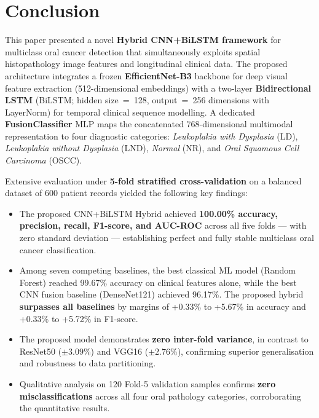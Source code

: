 %

\section{Conclusion}
\label{sec:conclusion}

This paper presented a novel \textbf{Hybrid CNN+BiLSTM framework} for multiclass oral cancer detection that simultaneously exploits spatial histopathology image features and longitudinal clinical data. The proposed architecture integrates a frozen \textbf{EfficientNet-B3} backbone for deep visual feature extraction (512-dimensional embeddings) with a two-layer \textbf{Bidirectional LSTM} (BiLSTM; hidden size~=~128, output~=~256 dimensions with LayerNorm) for temporal clinical sequence modelling. A dedicated \textbf{FusionClassifier} MLP maps the concatenated 768-dimensional multimodal representation to four diagnostic categories: \textit{Leukoplakia with Dysplasia} (LD), \textit{Leukoplakia without Dysplasia} (LND), \textit{Normal} (NR), and \textit{Oral Squamous Cell Carcinoma} (OSCC).

Extensive evaluation under \textbf{5-fold stratified cross-validation} on a balanced dataset of 600 patient records yielded the following key findings:

\begin{itemize}
    \item The proposed CNN+BiLSTM Hybrid achieved \textbf{100.00\% accuracy, precision, recall, F1-score, and AUC-ROC} across all five folds — with zero standard deviation — establishing perfect and fully stable multiclass oral cancer classification.

    \item Among seven competing baselines, the best classical ML model (Random Forest) reached 99.67\% accuracy on clinical features alone, while the best CNN fusion baseline (DenseNet121) achieved 96.17\%. The proposed hybrid \textbf{surpasses all baselines} by margins of +0.33\% to +5.67\% in accuracy and +0.33\% to +5.72\% in F1-score.

    \item The proposed model demonstrates \textbf{zero inter-fold variance}, in contrast to ResNet50 ($\pm3.09\%$) and VGG16 ($\pm2.76\%$), confirming superior generalisation and robustness to data partitioning.

    \item Qualitative analysis on 120 Fold-5 validation samples confirms \textbf{zero misclassifications} across all four oral pathology categories, corroborating the quantitative results.
\end{itemize}

